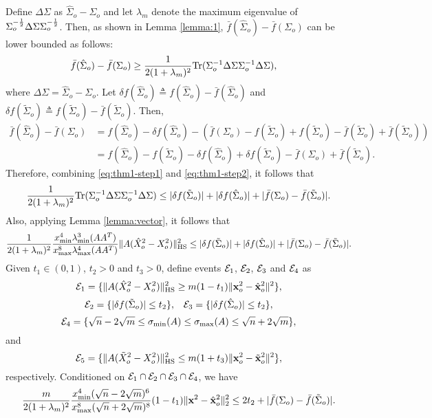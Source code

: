 \documentclass[onecolumn]{IEEEtran}
\newcommand{\xvh}{\hat{\xv}}
\newcommand{\xvt}{\tilde{\xv}}
\begin{document}
Define $\Delta \Sigma$ as $\hat{\Sigma}_o-\Sigma_o$ and let $\lambda_{m}$ denote the maximum eigenvalue of $\Sigma_o^{-{1\over 2}}\Delta \Sigma\Sigma_o^{-{1\over 2}}$. Then, as shown in Lemma \ref{lemma:1}, $\bar{f}(\hat{\Sigma}_o)-\bar{f}(\Sigma_o)$ can be lower bounded as follows:
\begin{align}
\bar{f}(\hat{\Sigma}_o)-\bar{f}(\Sigma_o)&\geq {1\over 2(1+\lambda_{m})^2}{\rm Tr}(\Sigma_o^{-1}\Delta \Sigma\Sigma_o^{-1}\Delta \Sigma),\label{eq:thm1-step2}
\end{align}
where  $\Delta \Sigma=\hat{\Sigma}_o-\Sigma_o$.  Let $\delta f(\hat{\Sigma}_o)\triangleq{f}(\hat{\Sigma}_o)-\bar{f}(\hat{\Sigma}_o)$ and $\delta f(\tilde{\Sigma}_o)\triangleq{f}(\tilde{\Sigma}_o)-\bar{f}(\tilde{\Sigma}_o)$. Then,
\begin{align}
\bar{f}(\hat{\Sigma}_o)-\bar{f}(\Sigma_o)&={f}(\hat{\Sigma}_o)-\delta f(\hat{\Sigma}_o)-(\bar{f}(\Sigma_o)-{f}(\tilde{\Sigma}_o)+{f}(\tilde{\Sigma}_o)-\bar{f}(\tilde{\Sigma}_o)+\bar{f}(\tilde{\Sigma}_o))\nonumber\\
&={f}(\hat{\Sigma}_o)-{f}(\tilde{\Sigma}_o)-\delta f(\hat{\Sigma}_o)+\delta f(\tilde{\Sigma}_o)-\bar{f}(\Sigma_o)+\bar{f}(\tilde{\Sigma}_o).
\end{align}
Therefore, combining \eqref{eq:thm1-step1} and \eqref{eq:thm1-step2}, it follows that
\[
 {1\over 2(1+\lambda_{m})^2}{\rm Tr}(\Sigma_o^{-1}\Delta \Sigma\Sigma_o^{-1}\Delta \Sigma)\leq |\delta f(\tilde{\Sigma}_o)| +|\delta f(\hat{\Sigma}_o)|+|\bar{f}(\Sigma_o)-\bar{f}(\tilde{\Sigma}_o)|.
\]
Also, applying Lemma \ref{lemma:vector}, it follows that
\[
 {1\over 2(1+\lambda_{m})^2} {x^4_{\min} \lambda^3_{\min}(AA^T) \over x^8_{\max} \lambda^4_{\max}(AA^T)  }\|A(\hat{X}_o^2-X_o^2)\|^2_{\rm HS}\leq |\delta f(\tilde{\Sigma}_o)| +|\delta f(\hat{\Sigma}_o)|+|\bar{f}(\Sigma_o)-\bar{f}(\tilde{\Sigma}_o)|.
\]
Given $t_1\in(0,1)$, $t_2>0$ and $t_3>0$,  define events $\mathcal{E}_1$,  $\mathcal{E}_2$, $\mathcal{E}_3$ and $\mathcal{E}_4$ as
\[
\Ec_1= \{\|A(\hat{X}_o^2-X_o^2)\|^2_{\rm HS}\geq m(1-t_1) \|\xv^2_o-\xvh^2_o\|^2\},
\]
\[
\mathcal{E}_2=\{ |\delta f(\tilde{\Sigma}_o)| \leq t_2\},  \;\;\;\mathcal{E}_3=\{ |\delta f(\hat{\Sigma}_o)|\leq t_2\},
\]
\[
\mathcal{E}_4=\{\sqrt{n}-2\sqrt{m}\leq \sigma_{\min} (A) \leq \sigma_{\max}(A) \leq \sqrt{n}+2\sqrt{m}\},
\]
and
\[
\Ec_5=\{\|A(\tilde{X}_o^2-X^2_o)\|^2_{\rm HS} \leq m(1+t_3)\|\xv_o^2-{\xvt^2_o}\|^2\},
\]
respectively. 
Conditioned on $\mathcal{E}_1\cap\mathcal{E}_2\cap\mathcal{E}_3\cap \mathcal{E}_4$, we have
\begin{equation}\label{eq:upperbound:almostlast}
 {m \over 2(1+\lambda_{m})^2} {x^4_{\min} (\sqrt{n} -2 \sqrt{m})^6 \over x^8_{\max} (\sqrt{n} +2 \sqrt{m})^8  } (1-t_1)\| \xv^2- \xvh_o^2\|_2^2\leq 2t_2+|\bar{f}(\Sigma_o)-\bar{f}(\tilde{\Sigma}_o)|.
\end{equation} 
\end{document}
